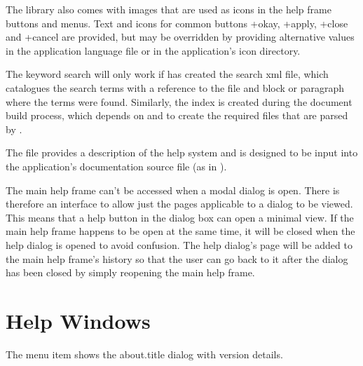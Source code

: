 \documentclass[toc=listof]{scrreport}
\begin{document}
The library also comes with images that are used as icons in the
help frame buttons and \glspl{menu}. Text and icons for common buttons 
\widget+{okay}, \widget+{apply}, \widget+{close} and
\widget+{cancel} are provided, but may be overridden by
providing alternative values in the application language file
or in the application's icon directory.

The keyword search will only work if  has created
the search \gls{xml} file, which catalogues the search terms with a
reference to the file and block or paragraph where the terms were
found. Similarly, the index is created during the document build
process, which depends on  and 
to create the required files that are parsed by .

The file  provides a description of the
help system and is designed to be input into the application's
documentation source file (as in ).

The main help frame can't be accessed when a modal dialog is open.
There is therefore an interface to allow just the pages applicable
to a dialog to be viewed. This means that a help button in the
dialog box can open a minimal view. If the main help frame happens
to be open at the same time, it will be closed when the help dialog
is opened to avoid confusion. The help dialog's page will be added
to the main help frame's history so that the user can go back to it
after the dialog has been closed by simply reopening the main help
frame.

\chapter{Help Windows}
\label{sec:helpwindows}


The  menu item shows the 
\InlineMsgDef
 {about.title}
dialog with version details.





\printmain

\printindex
\end{document}
